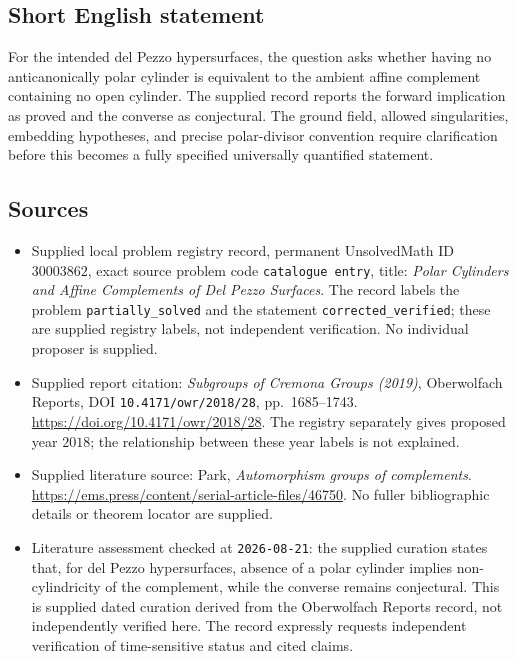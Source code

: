 \documentclass[11pt]{article}
\begin{document}
\subsection{Short English statement}
For the intended del Pezzo hypersurfaces, the question asks whether having no anticanonically polar cylinder is equivalent to the ambient affine complement containing no open cylinder. The supplied record reports the forward implication as proved and the converse as conjectural. The ground field, allowed singularities, embedding hypotheses, and precise polar-divisor convention require clarification before this becomes a fully specified universally quantified statement.
\subsection{Sources}
\begin{itemize}
\item Supplied local problem registry record, permanent UnsolvedMath ID \(30003862\), exact source problem code \texttt{catalogue entry}, title: \emph{Polar Cylinders and Affine Complements of Del Pezzo Surfaces}. The record labels the problem \texttt{partially\_solved} and the statement \texttt{corrected\_verified}; these are supplied registry labels, not independent verification. No individual proposer is supplied.
\item Supplied report citation: \emph{Subgroups of Cremona Groups (2019)}, Oberwolfach Reports, DOI \texttt{10.4171/owr/2018/28}, pp.~1685--1743. \url{https://doi.org/10.4171/owr/2018/28}. The registry separately gives proposed year \(2018\); the relationship between these year labels is not explained.
\item Supplied literature source: Park, \emph{Automorphism groups of complements}. \url{https://ems.press/content/serial-article-files/46750}. No fuller bibliographic details or theorem locator are supplied.
\item Literature assessment checked at \texttt{2026-08-21}: the supplied curation states that, for del Pezzo hypersurfaces, absence of a polar cylinder implies non-cylindricity of the complement, while the converse remains conjectural. This is supplied dated curation derived from the Oberwolfach Reports record, not independently verified here. The record expressly requests independent verification of time-sensitive status and cited claims.
\end{itemize}
\end{document}
